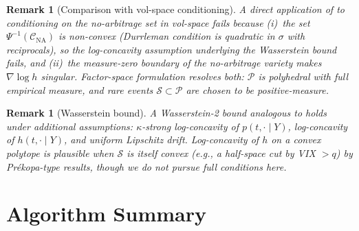\documentclass{article}
\newtheorem{remark}[theorem]{Remark}
\newcommand{\1}{\mathbf{1}}
\newcommand{\cP}{\mathcal{P}}
\newcommand{\cC}{\mathcal{C}}
\newcommand{\cS}{\mathcal{S}}
\begin{document}
\begin{remark}[Comparison with vol-space conditioning]
A direct application of \citet{guo2026} to conditioning on the no-arbitrage set in vol-space fails because (i)~the set $\Psi^{-1}(\cC_{\mathrm{NA}})$ is non-convex (Durrleman condition is quadratic in $\sigma$ with reciprocals), so the log-concavity assumption underlying the Wasserstein bound \citep[Theorem 4.6]{guo2026} fails, and (ii)~the measure-zero boundary of the no-arbitrage variety makes $\nabla \log h$ singular. Factor-space formulation resolves both: $\cP$ is polyhedral with full empirical measure, and rare events $\cS \subset \cP$ are chosen to be positive-measure.
\end{remark}

\begin{remark}[Wasserstein bound]
A Wasserstein-2 bound analogous to \citep[Theorem 4.6]{guo2026} holds under additional assumptions: $\kappa$-strong log-concavity of $p(t, \cdot \mid Y)$, log-concavity of $h(t, \cdot \mid Y)$, and uniform Lipschitz drift. Log-concavity of $h$ on a convex polytope is plausible when $\cS$ is itself convex (e.g., a half-space cut by VIX $> q$) by Prékopa-type results, though we do not pursue full conditions here.
\end{remark}

\section{Algorithm Summary}
\end{document}
